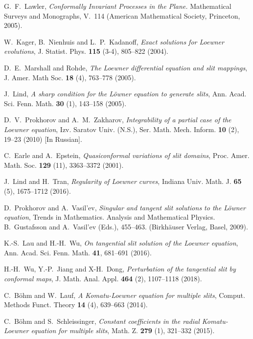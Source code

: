 \documentclass[
11pt,%
tightenlines,%
twoside,%
onecolumn,%
nofloats,%
nobibnotes,%
nofootinbib,%
superscriptaddress,%
noshowpacs,%
centertags]%
{revtex4}
\begin{document}
\begin{thebibliography}{20}

G.~F.~Lawler, \textit{Conformally Invariant Processes in the Plane.} Mathematical Surveys and Monographs, V.~114 (American Mathematical Society, Princeton, 2005).

W.~Kager, B.~Nienhuis and L.~P.~Kadanoff, \textit{Exact solutions for Loewner evolutions}, J. Statist. Phys. \textbf{115} (3-4), 805--822 (2004).

D.~E.~Marshall and Rohde, \textit{The Loewner differential equation and slit mappings}, J. Amer. Math Soc. \textbf{18} (4), 763--778 (2005).

J.~Lind, \textit{A sharp condition for the L\"owner equation to generate slits}, Ann. Acad. Sci. Fenn. Math. \textbf{30} (1), 143--158 (2005).

D.~V.~Prokhorov and A.~M.~Zakharov, \textit{Integrability of a partial case of the Loewner equation}, Izv. Saratov Univ. (N.S.), Ser. Math. Mech. Inform. \textbf{10} (2), 19--23 (2010) [In Russian].

C.~Earle and A.~Epstein, \textit{Quasiconformal variations of slit domains}, Proc. Amer. Math. Soc. \textbf{129} (11), 3363--3372 (2001).

J.~Lind and H.~Tran, \textit{Regularity of Loewner curves}, Indiana Univ. Math. J. \textbf{65} (5), 1675--1712 (2016).

D.~Prokhorov and A.~Vasil'ev, \textit{Singular and tangent slit solutions to the L\"owner equation}, Trends in Mathematics. Analysis and Mathematical Physics. B.~Gustafsson and A.~Vasil'ev (Eds.), 455--463. (Birkh\"auser Verlag, Basel, 2009).

K.-S.~Lau and H.-H.~Wu, \textit{On tangential slit solution of the Loewner equation}, Ann. Acad. Sci. Fenn. Math. \textbf{41}, 681--691 (2016).

H.-H.~Wu, Y.-P.~Jiang and X-H.~Dong, \textit{Perturbation of the tangential slit by conformal maps}, J. Math. Anal. Appl. \textbf{464} (2), 1107--1118 (2018).

C.~B\"ohm and W.~Lauf, \textit{A Komatu-Loewner equation for multiple slits}, Comput. Methods Funct. Theory \textbf{14} (4), 639--663 (2014).

C.~B\"ohm and S.~Schleissinger, \textit{Constant coefficients in the radial Komatu-Loewner equation for multiple slits}, Math. Z. \textbf{279} (1), 321--332 (2015).


\end{thebibliography}
\end{document}
